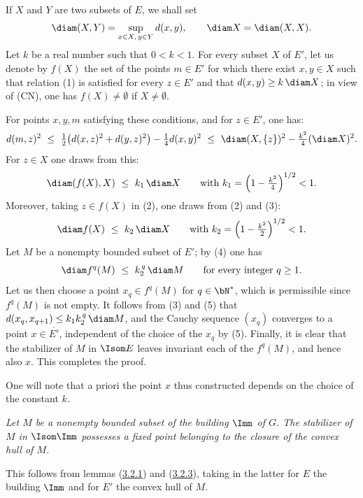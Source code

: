 \documentclass[12pt,a4paper,oneside,english]{smfart}
\makeatletter
\newcommand{\btanchor}[1]{\leavevmode\Hy@raisedlink{\hypertarget{bt:#1}{}}}
\newcommand{\btpageanchor}[1]{\Hy@raisedlink{\hypertarget{p:#1}{}}}
\newcommand{\btref}[1]{\hyperlink{bt:#1}{#1}}
\newcommand{\btpage}[1]{\marginnote{p.~#1}\btpageanchor{#1}}
\newcommand{\pagemark}[1]{\btpage{#1}}
\theoremstyle{definition}
\theoremstyle{bt}
\makeatother
\begin{document}
\medskip
If $X$ and $Y$ are two subsets of $E$, we shall set
\[
\diam(X,Y)=\sup_{x\in X,\,y\in Y} d(x,y),\qquad \diam X=\diam(X,X).
\]
Let $k$ be a real number such that $0<k<1$. For every subset $X$ of $E'$, let
us denote by $f(X)$ the set of the points $m\in E'$ for which there exist
$x,y\in X$ such that relation (1) is
\pagemark{64}
satisfied for every $z\in E'$ and that $d(x,y)\ge k\,\diam X$; in view of
(CN), one has $f(X)\neq\emptyset$ if $X\neq\emptyset$.

For points $x,y,m$ satisfying these conditions, and for $z\in E'$, one has:
\begin{equation}
d(m,z)^2\ \le\ \tfrac12\bigl(d(x,z)^2+d(y,z)^2\bigr)-\tfrac14 d(x,y)^2
\ \le\ \diam(X,\{z\})^2-\tfrac{k^2}{4}(\diam X)^2 .
\end{equation}
For $z\in X$ one draws from this:
\begin{equation}
\diam(f(X),X)\ \le\ k_1\,\diam X\qquad\text{with }
k_1=\Bigl(1-\tfrac{k^2}{4}\Bigr)^{1/2}<1 .
\end{equation}
Moreover, taking $z\in f(X)$ in (2), one draws from (2) and (3):
\begin{equation}
\diam f(X)\ \le\ k_2\,\diam X\qquad\text{with }
k_2=\Bigl(1-\tfrac{k^2}{2}\Bigr)^{1/2}<1 .
\end{equation}
Let $M$ be a nonempty bounded subset of $E'$; by (4) one has
\begin{equation}
\diam f^{q}(M)\ \le\ k_2^{\,q}\,\diam M\qquad\text{for every integer }q\ge 1.
\end{equation}
Let us then choose a point $x_q\in f^{q}(M)$ for $q\in\bN^{*}$, which is
permissible since $f^{q}(M)$ is not empty. It follows from (3) and (5) that
$d(x_q,x_{q+1})\le k_1k_2^{\,q}\,\diam M$, and the Cauchy sequence $(x_q)$
converges to a point $x\in\overline{E'}$, independent of the choice of the
$x_q$ by (5). Finally, it is clear that the stabilizer of $M$ in $\Isom E$
leaves invariant each of the $f^{q}(M)$, and hence also $x$. This completes
the proof.

One will note that a priori the point $x$ thus constructed depends on the
choice of the constant $k$.

\btanchor{3.2.4}
\emph{Let $M$ be a nonempty bounded subset of the building $\Imm$ of $G$. The
stabilizer of $M$ in $\Isom\Imm$ possesses a fixed point belonging to the
closure of the convex hull of $M$.}

\medskip
This follows from lemmas (\btref{3.2.1}) and (\btref{3.2.3}), taking in the latter for $E$ the
building $\Imm$ and for $E'$ the convex hull of $M$.
\end{document}
